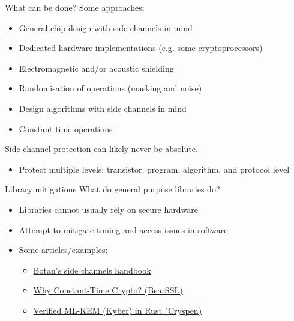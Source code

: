 \begin{frame}{What can be done?}
  Some approaches:
  \begin{itemize}[<+(1)->]
    \item General chip design with side channels in mind
    \item Dedicated hardware implementations (e.g. some cryptoprocessors)
    \item Electromagnetic and/or acoustic shielding
    \item Randomisation of operations (masking and noise)
    \item Design algorithms with side channels in mind
    \item Constant time operations
  \end{itemize}

  \vspace*{1em}

  \pause
  Side-channel protection can likely never be absolute.
  \begin{itemize}[<+(1)->]
    \item Protect multiple levels: transistor, program, algorithm, and protocol level
  \end{itemize}
\end{frame}

\begin{frame}{Library mitigations}
  What do general purpose libraries do?
  \begin{itemize}[<+(1)->]
    \item Libraries cannot usually rely on secure hardware
    \item Attempt to mitigate timing and access issues in software
    \item Some articles/examples:
    \begin{itemize}
    \item \href{https://botan.randombit.net/handbook/side_channels.html}{Botan's side channels handbook}
    \item \href{https://www.bearssl.org/constanttime.html}{Why Constant-Time Crypto? (BearSSL)}
    \item \href{https://cryspen.com/post/ml-kem-implementation/}{Verified ML-KEM (Kyber) in Rust (Cryspen)}
    \end{itemize}
  \end{itemize}
\end{frame}

